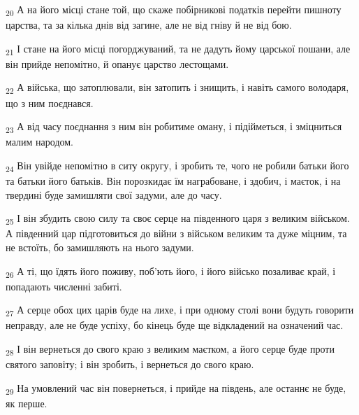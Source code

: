 \begin{tcolorbox}
\textsubscript{20} А на його місці стане той, що скаже побірникові податків перейти пишноту царства, та за кілька днів від загине, але не від гніву й не від бою.
\end{tcolorbox}
\begin{tcolorbox}
\textsubscript{21} І стане на його місці погорджуваний, та не дадуть йому царської пошани, але він прийде непомітно, й опанує царство лестощами.
\end{tcolorbox}
\begin{tcolorbox}
\textsubscript{22} А війська, що затоплювали, він затопить і знищить, і навіть самого володаря, що з ним поєднався.
\end{tcolorbox}
\begin{tcolorbox}
\textsubscript{23} А від часу поєднання з ним він робитиме оману, і підійметься, і зміцниться малим народом.
\end{tcolorbox}
\begin{tcolorbox}
\textsubscript{24} Він увійде непомітно в ситу округу, і зробить те, чого не робили батьки його та батьки його батьків. Він порозкидає їм награбоване, і здобич, і маєток, і на твердині буде замишляти свої задуми, але до часу.
\end{tcolorbox}
\begin{tcolorbox}
\textsubscript{25} І він збудить свою силу та своє серце на південного царя з великим військом. А південний цар підготовиться до війни з військом великим та дуже міцним, та не встоїть, бо замишляють на нього задуми.
\end{tcolorbox}
\begin{tcolorbox}
\textsubscript{26} А ті, що їдять його поживу, поб'ють його, і його військо позаливає край, і попадають численні забиті.
\end{tcolorbox}
\begin{tcolorbox}
\textsubscript{27} А серце обох цих царів буде на лихе, і при одному столі вони будуть говорити неправду, але не буде успіху, бо кінець буде ще відкладений на означений час.
\end{tcolorbox}
\begin{tcolorbox}
\textsubscript{28} І він вернеться до свого краю з великим маєтком, а його серце буде проти святого заповіту; і він зробить, і вернеться до свого краю.
\end{tcolorbox}
\begin{tcolorbox}
\textsubscript{29} На умовлений час він повернеться, і прийде на південь, але останнє не буде, як перше.
\end{tcolorbox}
